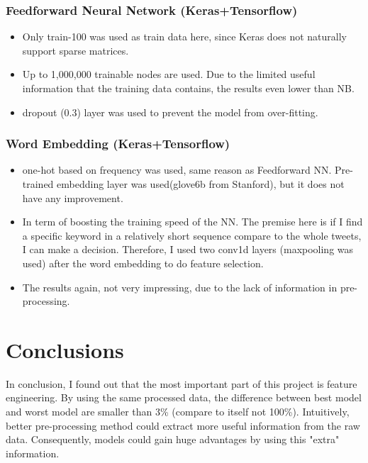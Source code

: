 \documentclass[11pt]{article}
\begin{document}
\subsubsection{Feedforward Neural Network (Keras+Tensorflow)}
\begin{itemize}
      \item Only train-100 was used as train data here, since Keras does not naturally
            support sparse matrices.
      \item Up to 1,000,000 trainable nodes are used. Due to the limited useful information
            that the training data contains, the results even lower than NB.
      \item dropout (0.3) layer was used to prevent the model from over-fitting.
\end{itemize}

\subsubsection{Word Embedding (Keras+Tensorflow)}
\begin{itemize}
      \item one-hot based on frequency was used, same reason as Feedforward NN.
            Pre-trained embedding layer was used(glove6b from Stanford), but it
            does not have any improvement.
      \item In term of boosting the training speed of the NN. The premise 
            here is if I find a specific keyword in a relatively short sequence
            compare to the whole tweets, I can make a decision. Therefore, 
            I used two conv1d layers (maxpooling was used) after the word embedding 
            to do feature selection.
      \item The results again, not very impressing, due to the lack of information in
            pre-processing.
\end{itemize}


\section{Conclusions}

In conclusion, I found out that the most important part of this project is feature engineering.
By using the same processed data, the difference between best model and worst model are smaller
than 3\% (compare to itself not 100\%). Intuitively, better pre-processing method could extract 
more useful information from the raw data. Consequently, models could gain huge advantages by 
using this "extra" information.



\end{document}
